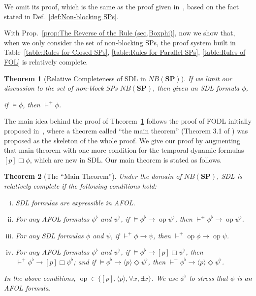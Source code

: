 \documentclass{fcs}
\newtheorem{mytheo}{Theorem}[section]
\newcommand{\la}[0]{\langle}
\newcommand{\ra}[0]{\rangle}
\newcommand{\SP}[0]{\mathbf{SP}}
\newcommand{\reld}[0]{\mathit{\vdash^+}}
\newcommand{\NB}[0]{\mathit{NB}}
\begin{document}
We omit its proof, which is the same as the proof given in~\cite{Platzer07}, based on the fact stated in Def.~\ref{def:Non-blocking SPs}.

With Prop.~\ref{prop:The Reverse of the Rule (seq,Boxphi)}, now we show that, when we only consider the set of non-blocking SPs, the proof system built in Table~\ref{table:Rules for Closed SPs}, \ref{table:Rules for Parallel SPs}, \ref{table:Rules of FOL}
is relatively complete.

\begin{mytheo}[Relative Completeness of SDL in $\NB(\SP)$]
\label{theorem:Relative Completeness of SDL}
    If we limit our discussion to the set of non-block SPs $\NB(\SP)$,
    then given an SDL formula $\phi$,
    \begin{center}
    if $\models \phi$, then $\reld\phi$.
    \end{center}
\end{mytheo}

The main idea behind the proof of Theorem~\ref{theorem:Relative Completeness of SDL} follows the proof of FODL initially proposed in~\cite{Harel79}, where a theorem called ``the main theorem'' (Theorem 3.1 of \cite{Harel79}) was proposed as the skeleton of the whole proof.
We give our proof by augmenting that main theorem with one more condition for the temporal dynamic formulas $[p]\Box\phi$, which are new in SDL.
Our main theorem is stated as follows.

\begin{mytheo}[The ``Main Theorem'']
\label{theorem:The ``Main Theorem''}
    Under the domain of $\NB(\SP)$, SDL is relatively complete if the following conditions hold:
    \begin{enumerate}[(i)]
        \item SDL formulas are expressible in AFOL.
        \item For any AFOL formulas $\phi^\flat$ and $\psi^\flat$, if $\models \phi^\flat \to \mathop{op}\psi^\flat$, then $\reld \phi^\flat\to \mathop{op}\psi^\flat$.
        \item For any SDL formulas $\phi$ and $\psi$, if $\reld \phi\to \psi$, then $\reld \mathop{op} \phi\to \mathop{op} \psi$.
        \item For any AFOL formulas $\phi^\flat$ and $\psi^\flat$, if $\models \phi^\flat\to [p]\Box\psi^\flat$, then $\reld \phi^\flat\to [p]\Box\psi^\flat$; and
        if $\models \phi^\flat\to \la p\ra \Diamond\psi^\flat$, then $\reld\phi^\flat\to \la p\ra\Diamond\psi^\flat$.
    \end{enumerate}
    In the above conditions,  $\mathop{op}\in \{[p], \la p\ra, \forall x, \exists x\}$.
    We use $\phi^\flat$ to stress that $\phi$ is an AFOL formula.
\end{mytheo}
\end{document}
